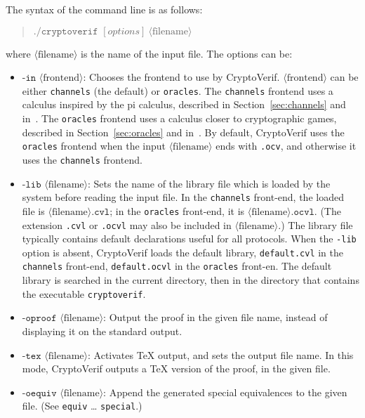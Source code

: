 \documentclass{article}
\newcommand{\nonterm}[1]{\langle\textrm{#1}\rangle}
\begin{document}
The syntax of the command line is as follows:
\begin{quote}
$\texttt{./cryptoverif }[options]\ \nonterm{filename}$
\end{quote}
where $\nonterm{filename}$ is the name of the input file.
The options can be:
\begin{itemize}

\item $\texttt{-in }\nonterm{frontend}$: Chooses the frontend to use
by CryptoVerif. $\nonterm{frontend}$ can be either \texttt{channels}
(the default) or \texttt{oracles}. The \texttt{channels} frontend
uses a calculus inspired by the pi calculus, described 
in Section~\ref{sec:channels} and in~\cite{Blanchet06,BlanchetEPrint05}.
The \texttt{oracles} frontend uses a calculus closer to cryptographic
games, described in Section~\ref{sec:oracles} and 
in~\cite{Blanchet06b,BlanchetPointchevalEPrint06}.
By default, CryptoVerif uses the \texttt{oracles} frontend when the input
$\nonterm{filename}$ ends with \texttt{.ocv}, and otherwise it uses the
\texttt{channels} frontend.

\item $\texttt{-lib }\nonterm{filename}$: Sets the name of the library
  file which is loaded by the system
  before reading the input file. In the \texttt{channels} front-end,
  the loaded file is $\nonterm{filename}\texttt{.cvl}$; in the
  \texttt{oracles} front-end, it is
  $\nonterm{filename}\texttt{.ocvl}$. (The extension \texttt{.cvl}
  or \texttt{.ocvl} may also be included in $\nonterm{filename}$.)
  The library file typically contains default declarations useful for all protocols.
  When the \texttt{-lib} option is absent, CryptoVerif loads the
  default library, \texttt{default.cvl} in the \texttt{channels} front-end,
  \texttt{default.ocvl} in the \texttt{oracles} front-en.
  The default library is searched in the current directory, then
  in the directory that contains the executable \texttt{cryptoverif}.

\item $\texttt{-oproof }\nonterm{filename}$: Output the proof
in the given file name, instead of displaying it on the standard output.

\item $\texttt{-tex }\nonterm{filename}$: Activates TeX output, and sets
the output file name. In this mode, CryptoVerif outputs a TeX version
of the proof, in the given file.

\item $\texttt{-oequiv }\nonterm{filename}$: Append the generated 
special equivalences to the given file. (See \texttt{equiv} \dots 
\texttt{special}.)


\end{itemize}
\end{document}
